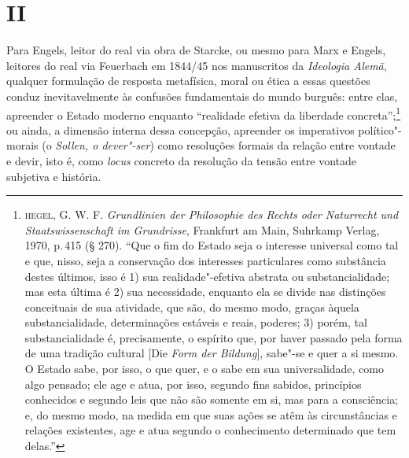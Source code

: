 \section*{II}

Para Engels, leitor do real via obra de Starcke, ou mesmo para Marx e
Engels, leitores do real via Feuerbach em 1844/45 nos manuscritos da
\emph{Ideologia Alemã}, qualquer formulação de resposta metafísica,
moral ou ética a essas questões conduz inevitavelmente às confusões
fundamentais do mundo burguês: entre elas, apreender o Estado moderno
enquanto ``realidade efetiva da liberdade concreta'';\footnote{\textsc{hegel}, G.
  W. F. \emph{Grundlinien der Philosophie des Rechts oder Naturrecht und
  Staatswissenschaft im Grundrisse}, Frankfurt am Main, Suhrkamp Verlag,
  1970, p.\,415 (§ 270). ``Que o fim do Estado seja o interesse universal
  como tal e que, nisso, seja a conservação dos interesses particulares
  como substância destes últimos, isso é 1) sua realidade"-efetiva
  abstrata ou substancialidade; mas esta última é 2) sua necessidade,
  enquanto ela se divide nas distinções conceituais de sua atividade,
  que são, do mesmo modo, graças àquela substancialidade, determinações
  estáveis e reais, poderes; 3) porém, tal substancialidade é,
  precisamente, o espírito que, por haver passado pela forma de uma
  tradição cultural {[}Die \emph{Form der Bildung}{]}, sabe"-se e quer a
  si mesmo. O Estado sabe, por isso, o que quer, e o sabe em sua
  universalidade, como algo pensado; ele age e atua, por isso, segundo
  fins sabidos, princípios conhecidos e segundo leis que não são somente
  em si, mas para a consciência; e, do mesmo modo, na medida em que suas
  ações se atêm às circunstâncias e relações existentes, age e atua
  segundo o conhecimento determinado que tem delas.''} ou ainda, a
dimensão interna dessa concepção, apreender os imperativos
político"-morais (o \emph{Sollen, o dever"-ser}) como resoluções formais
da relação entre vontade e devir, isto é, como \emph{locus} concreto da
resolução da tensão entre vontade subjetiva e história.

